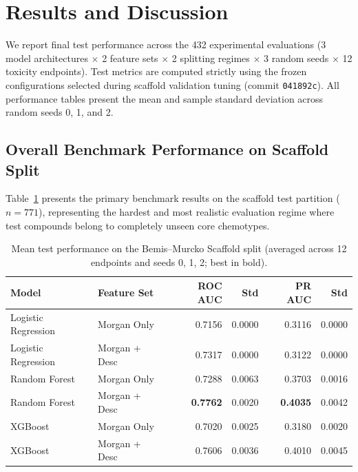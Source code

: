 \section{Results and Discussion}
\label{sec:results}

We report final test performance across the 432 experimental evaluations (3 model architectures $\times$ 2 feature sets $\times$ 2 splitting regimes $\times$ 3 random seeds $\times$ 12 toxicity endpoints). Test metrics are computed strictly using the frozen configurations selected during scaffold validation tuning (commit \texttt{041892c}). All performance tables present the mean and sample standard deviation across random seeds 0, 1, and 2.

\subsection{Overall Benchmark Performance on Scaffold Split}
Table~\ref{tab:results_scaffold} presents the primary benchmark results on the scaffold test partition ($n=771$), representing the hardest and most realistic evaluation regime where test compounds belong to completely unseen core chemotypes.

\begin{table}[t]
\caption{Mean test performance on the Bemis--Murcko Scaffold split (averaged across 12 endpoints and seeds 0, 1, 2; best in bold).}
\label{tab:results_scaffold}
\centering\small
\setlength{\tabcolsep}{4pt}
\begin{tabular}{@{}llrrrr@{}}
\toprule
Model & Feature Set & ROC AUC & Std & PR AUC & Std \\
\midrule
Logistic Regression & Morgan Only & 0.7156 & 0.0000 & 0.3116 & 0.0000 \\
Logistic Regression & Morgan + Desc & 0.7317 & 0.0000 & 0.3122 & 0.0000 \\
Random Forest & Morgan Only & 0.7288 & 0.0063 & 0.3703 & 0.0016 \\
Random Forest & Morgan + Desc & \textbf{0.7762} & 0.0020 & \textbf{0.4035} & 0.0042 \\
XGBoost & Morgan Only & 0.7020 & 0.0025 & 0.3180 & 0.0020 \\
XGBoost & Morgan + Desc & 0.7606 & 0.0036 & 0.4010 & 0.0045 \\
\bottomrule
\end{tabular}
\end{table}

